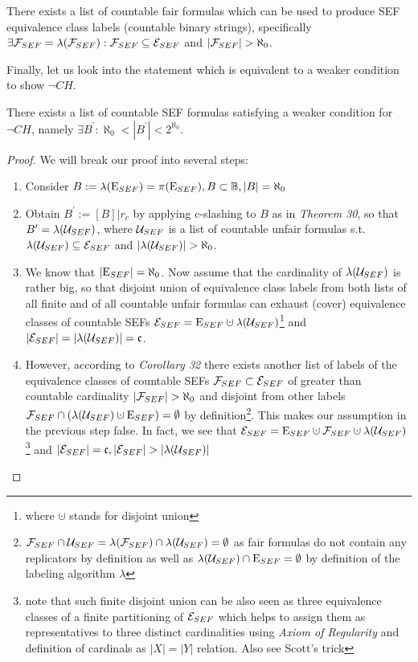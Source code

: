 \begin{corollary}
  There exists a list of countable fair formulas which can be used to produce SEF equivalence class labels (countable binary strings), specifically $\exists \mathcal{F}_{SEF} = \lambda(\mathcal{F}_{SEF}): \mathcal{F}_{SEF} \subseteq \mathcal{E}_{SEF}$ and $|\mathcal{F}_{SEF}| > \aleph_0$.
\end{corollary}

Finally, let us look into the statement which is equivalent to a weaker condition to show $\neg CH$.

\begin{theorem}\label{st_not_ch}
  There exists a list of countable SEF formulas satisfying a weaker condition for $\neg CH$, namely $\exists B^\prime: \aleph_0 < |B^\prime| < 2^{\aleph_0}$.
\end{theorem}
\begin{proof}
  We will break our proof into several steps:
  \begin{enumerate}
    \item Consider $B := \lambda(\mathrm{E}_{SEF}) = \pi(\mathrm{E}_{SEF}), B \subset \mathbb{B}, |B| = \aleph_0$
    \item Obtain $B^\prime := [B]|r_c$ by applying c-slashing to $B$ as in \textit{Theorem 30}, so that $B^\prime = \lambda(\mathcal{U}_{SEF})$, where $\mathcal{U}_{SEF}$ is a list of countable unfair formulas s.t. $\lambda(\mathcal{U}_{SEF}) \subseteq \mathcal{E}_{SEF}$ and $|\lambda(\mathcal{U}_{SEF})| > \aleph_0$.
    \item We know that $|\mathrm{E}_{SEF}| = \aleph_0$. Now assume that the cardinality of $\lambda(\mathcal{U}_{SEF})$ is rather big, so that disjoint union of equivalence class labels from both lists of all finite and of all countable unfair formulas can exhaust (cover) equivalence classes of countable SEFs $\uesef = \cesef \cupdot \lambda(\uusef)$\footnote{where $\cupdot$ stands for disjoint union} and $|\mathcal{E}_{SEF}| = |\lambda(\mathcal{U}_{SEF})| = \mathfrak{c}$.
    \item However, according to \textit{Corollary 32} there exists another list of labels of the equivalence classes of countable SEFs $\mathcal{F}_{SEF} \subset \mathcal{E}_{SEF}$ of greater than countable cardinality $|\mathcal{F}_{SEF}| > \aleph_0$ and disjoint from other labels $\ufsef \cap (\lambda(\uusef) \cupdot \cesef) = \emptyset$ by definition\footnote{$\mathcal{F}_{SEF} \cap \mathcal{U}_{SEF} = \lambda(\mathcal{F}_{SEF}) \cap \lambda(\mathcal{U}_{SEF})  = \emptyset$ as fair formulas do not contain any replicators by definition as well as $\lambda(\mathcal{U}_{SEF}) \cap \mathrm{E}_{SEF} = \emptyset$ by definition of the labeling algorithm $\lambda$}. This makes our assumption in the previous step false. In fact, we see that $\uesef = \cesef \cupdot \ufsef \cupdot \lambda(\uusef)$\footnote{note that such finite disjoint union can be also seen as three equivalence classes of a finite partitioning of $\mathcal{E}_{SEF}$ which helps to assign them as representatives to three distinct cardinalities using \textit{Axiom of Regularity} and definition of cardinals as $|X| = |Y|$ relation\cite{jech2003set}. Also see Scott's trick\cite{enwiki:1056369148, karagila2017}} and $|\mathcal{E}_{SEF}| = \mathfrak{c}, |\mathcal{E}_{SEF}| > |\lambda(\mathcal{U}_{SEF})|$

\end{enumerate}
\end{proof}
